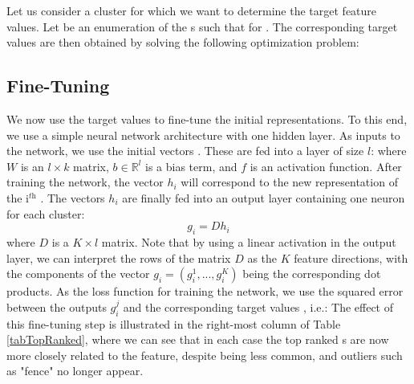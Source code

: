 Let us consider a cluster  for which we want to determine the target feature values. Let  be an enumeration of the s such that  for . The corresponding target values  are then obtained by solving the following optimization problem:
\subsection{Fine-Tuning}


We now use the target values  to fine-tune the initial representations. To this end, we use a simple neural network architecture with one hidden layer. As inputs to the network, we use the initial vectors . These are fed into a layer of size $l$:
where $W$ is an $l\times k$ matrix, $b\in \mathbb{R}^l$ is a bias term, and $f$ is an activation function. After training the network, the vector $h_i$ will correspond to the new representation of the i$^{\textit{th}}$ . The vectors $h_i$ are finally fed into an output layer containing one neuron for each cluster:
$$
g_i = D h_i
$$
where $D$ is a $K \times l$ matrix. Note that by using a linear activation in the output layer, we can interpret the rows of the matrix $D$ as the $K$ feature directions, with the components of the vector $g_i = (g_i^1,...,g_i^K)$  being the corresponding dot products. %
As the loss function for training the network, we use the squared error between the outputs $g_i^j$ and the corresponding target values  , i.e.:
The effect of this fine-tuning step is illustrated in the right-most column of Table \ref{tabTopRanked}, where we can see that in each case the top ranked s are now more closely related to the feature, despite being less common, and outliers such as "fence" no longer appear. 

